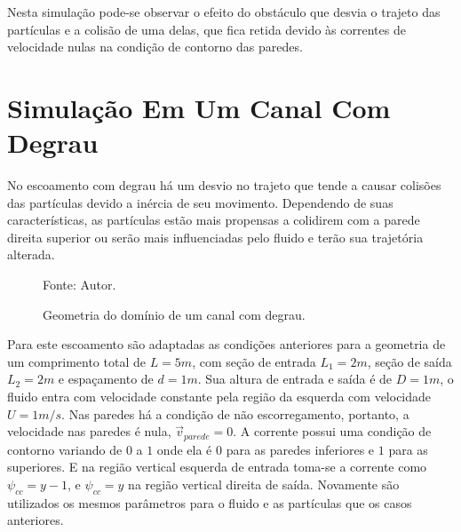 Nesta simulação pode-se observar o efeito do obstáculo que desvia o trajeto das partículas e a colisão de uma delas, que fica retida devido às correntes de velocidade nulas na condição de contorno das paredes.

\section{\textbf{Simulação Em Um Canal Com Degrau}}
\label{sec_step}
No escoamento com degrau há um desvio no trajeto que tende a causar colisões das partículas devido a inércia de seu movimento.
Dependendo de suas características, as partículas estão mais propensas a colidirem com a parede direita superior ou serão mais influenciadas pelo fluido e terão sua trajetória alterada.

\begin{figure}[H]
    \centering
     {\raggedleft \scriptsize Fonte: Autor.}
    \caption{Geometria do domínio de um canal com degrau.}
    \label{step_geometry}
\end{figure}

Para este escoamento são adaptadas as condições anteriores para a geometria de um comprimento total de $L=5m$, com seção de entrada $L_1=2m$, seção de saída $L_2=2m$ e espaçamento de $d=1m$.
Sua altura de entrada e saída é de $D=1m$, o fluido entra com velocidade constante pela região da esquerda com velocidade $U=1m/s$. %
Nas paredes há a condição de não escorregamento, portanto, a velocidade nas paredes é nula, $\vec{v}_{parede}=0$.
A corrente possui uma condição de contorno variando de $0$ a $1$ onde ela é $0$ para as paredes inferiores e $1$ para as superiores.
E na região vertical esquerda de entrada toma-se a corrente como $\psi_{cc}=y-1$, e $\psi_{cc}=y$ na região vertical direita de saída.
Novamente são utilizados os mesmos parâmetros para o fluido e as partículas que os casos anteriores.

